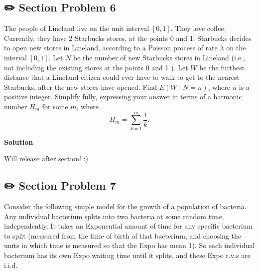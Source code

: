 \documentclass[
  letterpaper,
  DIV=11,
  numbers=noendperiod]{scrreprt}
\theoremstyle{definition}
\theoremstyle{plain}
\theoremstyle{remark}
\begin{document}
\hypertarget{section-problem-6-1}{%
\subsection*{✏️ Section Problem 6}\label{section-problem-6-1}}

The people of Lineland live on the unit interval \([0,1]\). They love
coffee. Currently, they have 2 Starbucks stores, at the points 0 and 1.
Starbucks decides to open new stores in Lineland, according to a Poisson
process of rate \(\lambda\) on the interval \([0,1]\). Let \(N\) be the
number of new Starbucks stores in Lineland (i.e., not including the
existing stores at the points 0 and 1 ). Let \(W\) be the furthest
distance that a Lineland citizen could ever have to walk to get to the
nearest Starbucks, after the new stores have opened. Find
\(E(W \mid N=n)\), where \(n\) is a positive integer. Simplify fully,
expressing your answer in terms of a harmonic number \(H_m\) for some
\(m\), where \[
H_m=\sum_{k=1}^m \frac{1}{k} .
\]

\begin{tcolorbox}[enhanced jigsaw, leftrule=.75mm, colframe=quarto-callout-tip-color-frame, colback=white, breakable, opacityback=0, left=2mm, bottomrule=.15mm, arc=.35mm, rightrule=.15mm, toprule=.15mm]
\begin{minipage}[t]{5.5mm}
\textcolor{quarto-callout-tip-color}{\faLightbulb}
\end{minipage}%
\begin{minipage}[t]{\textwidth - 5.5mm}

\textbf{Solution}\vspace{2mm}

Will release after section! :)

\end{minipage}%
\end{tcolorbox}

\hypertarget{section-problem-7}{%
\subsection*{✏️ Section Problem 7}\label{section-problem-7}}

Consider the following simple model for the growth of a population of
bacteria. Any individual bacterium splits into two bacteria at some
random time, independently. It takes an Exponential amount of time for
any specific bacterium to split (measured from the time of birth of that
bacterium, and choosing the units in which time is measured so that the
Expo has mean 1). So each individual bacterium has its own Expo waiting
time until it splits, and these Expo r.v.s are i.i.d.
\end{document}
